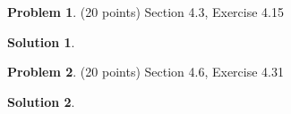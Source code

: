 \documentclass{article}
\theoremstyle{definition}
\newtheorem{problem}{Problem}
\newtheorem*{solution}{Solution}
\begin{document}
\newpage
\begin{problem} (20 points) Section 4.3, Exercise 4.15
\end{problem}
\begin{solution} 

\end{solution}

\newpage
\begin{problem} (20 points) Section 4.6, Exercise 4.31
\end{problem}
\begin{solution} 

\end{solution}
\end{document}
